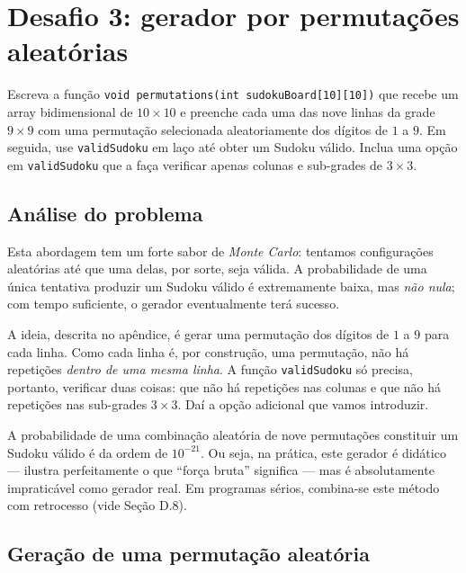 \documentclass[11pt,a4paper,oneside]{report}
\newcommand{\codigo}[1]{\texttt{\color{deitelblue}#1}}
\begin{document}
\section{Desafio 3: gerador por permutações aleatórias}

\begin{enunciado}
Escreva a função \texttt{void permutations(int sudokuBoard[10][10])} que
recebe um array bidimensional de $10 \times 10$ e preenche cada uma das
nove linhas da grade $9 \times 9$ com uma permutação selecionada
aleatoriamente dos dígitos de $1$ a $9$. Em seguida, use \texttt{validSudoku}
em laço até obter um Sudoku válido. Inclua uma opção em \texttt{validSudoku}
que a faça verificar apenas colunas e sub-grades de $3 \times 3$.
\end{enunciado}

\subsection{Análise do problema}

Esta abordagem tem um forte sabor de \emph{Monte Carlo}: tentamos
configurações aleatórias até que uma delas, por sorte, seja válida. A
probabilidade de uma única tentativa produzir um Sudoku válido é
extremamente baixa, mas \emph{não nula}; com tempo suficiente, o gerador
eventualmente terá sucesso.

A ideia, descrita no apêndice, é gerar uma permutação dos dígitos de $1$
a $9$ para cada linha. Como cada linha é, por construção, uma permutação,
não há repetições \emph{dentro de uma mesma linha}. A função
\codigo{validSudoku} só precisa, portanto, verificar duas coisas: que não
há repetições nas colunas e que não há repetições nas sub-grades $3 \times 3$.
Daí a opção adicional que vamos introduzir.

\begin{desempenho}
A probabilidade de uma combinação aleatória de nove permutações constituir
um Sudoku válido é da ordem de $10^{-21}$. Ou seja, na prática, este
gerador é didático --- ilustra perfeitamente o que ``força bruta'' significa
--- mas é absolutamente impraticável como gerador real. Em programas sérios,
combina-se este método com retrocesso (vide Seção D.8).
\end{desempenho}

\subsection{Geração de uma permutação aleatória}
\end{document}
